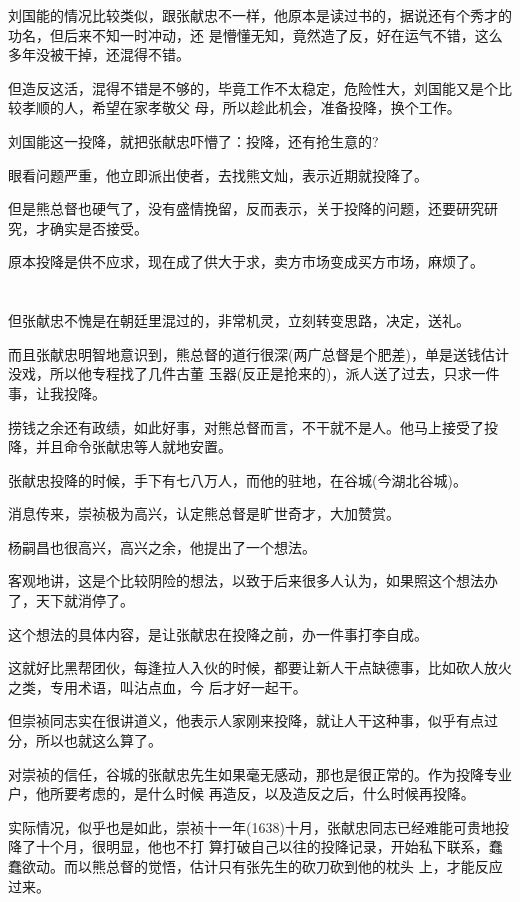 \documentclass[11pt,a4paper,onecolumn]{article}
\begin{document}
刘国能的情况比较类似，跟张献忠不一样，他原本是读过书的，据说还有个秀才的功名，但后来不知一时冲动，还
是懵懂无知，竟然造了反，好在运气不错，这么多年没被干掉，还混得不错。

但造反这活，混得不错是不够的，毕竟工作不太稳定，危险性大，刘国能又是个比较孝顺的人，希望在家孝敬父
母，所以趁此机会，准备投降，换个工作。

刘国能这一投降，就把张献忠吓懵了：投降，还有抢生意的?

眼看问题严重，他立即派出使者，去找熊文灿，表示近期就投降了。

但是熊总督也硬气了，没有盛情挽留，反而表示，关于投降的问题，还要研究研究，才确实是否接受。

原本投降是供不应求，现在成了供大于求，卖方市场变成买方市场，麻烦了。

\section[\thesection]{}

但张献忠不愧是在朝廷里混过的，非常机灵，立刻转变思路，决定，送礼。

而且张献忠明智地意识到，熊总督的道行很深(两广总督是个肥差)，单是送钱估计没戏，所以他专程找了几件古董
玉器(反正是抢来的)，派人送了过去，只求一件事，让我投降。

捞钱之余还有政绩，如此好事，对熊总督而言，不干就不是人。他马上接受了投降，并且命令张献忠等人就地安置。

张献忠投降的时候，手下有七八万人，而他的驻地，在谷城(今湖北谷城)。

消息传来，崇祯极为高兴，认定熊总督是旷世奇才，大加赞赏。

杨嗣昌也很高兴，高兴之余，他提出了一个想法。

客观地讲，这是个比较阴险的想法，以致于后来很多人认为，如果照这个想法办了，天下就消停了。

这个想法的具体内容，是让张献忠在投降之前，办一件事\myrule 打李自成。

这就好比黑帮团伙，每逢拉人入伙的时候，都要让新人干点缺德事，比如砍人放火之类，专用术语，叫沾点血，今
后才好一起干。

但崇祯同志实在很讲道义，他表示人家刚来投降，就让人干这种事，似乎有点过分，所以也就这么算了。

对崇祯的信任，谷城的张献忠先生如果毫无感动，那也是很正常的。作为投降专业户，他所要考虑的，是什么时候
再造反，以及造反之后，什么时候再投降。

实际情况，似乎也是如此，崇祯十一年(1638)十月，张献忠同志已经难能可贵地投降了十个月，很明显，他也不打
算打破自己以往的投降记录，开始私下联系，蠢蠢欲动。而以熊总督的觉悟，估计只有张先生的砍刀砍到他的枕头
上，才能反应过来。
\end{document}

